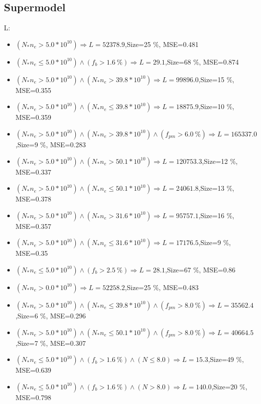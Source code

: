 \documentclass[numbered]{CSL}
\begin{document}
\subsection{Supermodel}
L:
\begin{itemize}
\item $(N_* n_e > 5.0 * 10^{10}) \Rightarrow L = 52378.9$,\hfill Size=25 \%, MSE=0.481
\item $(N_* n_e \leq 5.0 * 10^{10}) \land (f_b > 1.6~\%) \Rightarrow L = 29.1$,\hfill Size=68 \%, MSE=0.874
\item $(N_* n_e > 5.0 * 10^{10}) \land (N_* n_e > 39.8 * 10^{10}) \Rightarrow L = 99896.0$,\hfill Size=15 \%, MSE=0.355
\item $(N_* n_e > 5.0 * 10^{10}) \land (N_* n_e \leq 39.8 * 10^{10}) \Rightarrow L = 18875.9$,\hfill Size=10 \%, MSE=0.359
\item $(N_* n_e > 5.0 * 10^{10}) \land (N_* n_e > 39.8 * 10^{10}) \land (f_{pm} > 6.0~\%) \Rightarrow L = 165337.0$,\hfill Size=9 \%, MSE=0.283
\item $(N_* n_e > 5.0 * 10^{10}) \land (N_* n_e > 50.1 * 10^{10}) \Rightarrow L = 120753.3$,\hfill Size=12 \%, MSE=0.337
\item $(N_* n_e > 5.0 * 10^{10}) \land (N_* n_e \leq 50.1 * 10^{10}) \Rightarrow L = 24061.8$,\hfill Size=13 \%, MSE=0.378
\item $(N_* n_e > 5.0 * 10^{10}) \land (N_* n_e > 31.6 * 10^{10}) \Rightarrow L = 95757.1$,\hfill Size=16 \%, MSE=0.357
\item $(N_* n_e > 5.0 * 10^{10}) \land (N_* n_e \leq 31.6 * 10^{10}) \Rightarrow L = 17176.5$,\hfill Size=9 \%, MSE=0.35
\item $(N_* n_e \leq 5.0 * 10^{10}) \land (f_b > 2.5~\%) \Rightarrow L = 28.1$,\hfill Size=67 \%, MSE=0.86
\item $(N_* n_e > 0.0 * 10^{10}) \Rightarrow L = 52258.2$,\hfill Size=25 \%, MSE=0.483
\item $(N_* n_e > 5.0 * 10^{10}) \land (N_* n_e \leq 39.8 * 10^{10}) \land (f_{pm} > 8.0~\%) \Rightarrow L = 35562.4$,\hfill Size=6 \%, MSE=0.296
\item $(N_* n_e > 5.0 * 10^{10}) \land (N_* n_e \leq 50.1 * 10^{10}) \land (f_{pm} > 8.0~\%) \Rightarrow L = 40664.5$,\hfill Size=7 \%, MSE=0.307
\item $(N_* n_e \leq 5.0 * 10^{10}) \land (f_b > 1.6~\%) \land (N \leq 8.0) \Rightarrow L = 15.3$,\hfill Size=49 \%, MSE=0.639
\item $(N_* n_e \leq 5.0 * 10^{10}) \land (f_b > 1.6~\%) \land (N > 8.0) \Rightarrow L = 140.0$,\hfill Size=20 \%, MSE=0.798

\end{itemize}
\end{document}
